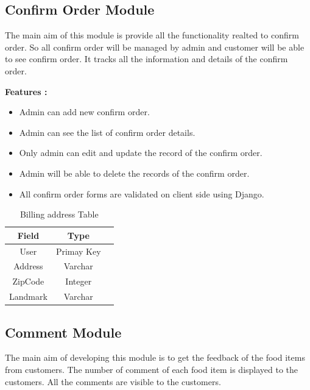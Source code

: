 \documentclass[12pt,a4paper]{report}
\begin{document}
\subsection{Confirm Order Module}
\hspace{0.25cm}
\par
The main aim of this module is provide all the functionality realted to confirm order. So all confirm order will be managed by admin and customer will be able to see confirm order. It tracks all the information and details of the confirm order.

\textbf{Features :}
\begin{itemize}
	\item Admin can add new confirm order.
	\item Admin can see the list of confirm order details.
	\item Only admin can edit and update the record of the confirm order.
	\item Admin will be able to delete the records of the confirm order.
	\item All confirm order forms are validated on client side using Django.
\end{itemize}

\begin{table}
  \begin{center}
    \begin{tabular}{ |c|c|c| } 
    \hline
    Field & Type  \\
    \hline
    User & Primay Key \\
    \hline
    Address & Varchar \\
    \hline
    ZipCode & Integer \\
    \hline
    Landmark & Varchar \\
    \hline
    \end{tabular}
    \caption{ Billing address Table }
    \end{center}
  \end{table}


\subsection{Comment Module }
\hspace{0.25cm}
\par
The main aim of developing this module is to get the feedback of the food items from customers. The number of comment of each food item is displayed to the customers. All the comments are visible to the customers.
\end{document}

